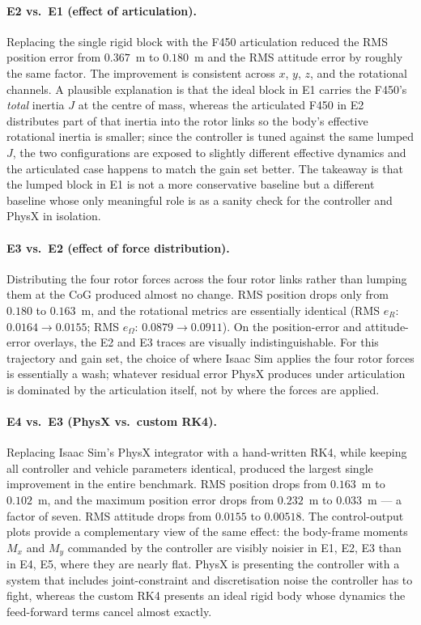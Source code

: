 \documentclass[11pt]{article}
\theoremstyle{remark}
\begin{document}
\paragraph{E2 vs.\ E1 (effect of articulation).} Replacing the single rigid block with the F450 articulation reduced the RMS position error from $0.367$~m to $0.180$~m and the RMS attitude error by roughly the same factor. The improvement is consistent across $x$, $y$, $z$, and the rotational channels. A plausible explanation is that the ideal block in E1 carries the F450's \emph{total} inertia $J$ at the centre of mass, whereas the articulated F450 in E2 distributes part of that inertia into the rotor links so the body's effective rotational inertia is smaller; since the controller is tuned against the same lumped $J$, the two configurations are exposed to slightly different effective dynamics and the articulated case happens to match the gain set better. The takeaway is that the lumped block in E1 is not a more conservative baseline but a different baseline whose only meaningful role is as a sanity check for the controller and PhysX in isolation.

\paragraph{E3 vs.\ E2 (effect of force distribution).} Distributing the four rotor forces across the four rotor links rather than lumping them at the CoG produced almost no change. RMS position drops only from $0.180$ to $0.163$~m, and the rotational metrics are essentially identical (RMS $e_R$: $0.0164 \to 0.0155$; RMS $e_\Omega$: $0.0879 \to 0.0911$). On the position-error and attitude-error overlays, the E2 and E3 traces are visually indistinguishable. For this trajectory and gain set, the choice of where Isaac Sim applies the four rotor forces is essentially a wash; whatever residual error PhysX produces under articulation is dominated by the articulation itself, not by where the forces are applied.

\paragraph{E4 vs.\ E3 (PhysX vs.\ custom RK4).} Replacing Isaac Sim's PhysX integrator with a hand-written RK4, while keeping all controller and vehicle parameters identical, produced the largest single improvement in the entire benchmark. RMS position drops from $0.163$~m to $0.102$~m, and the maximum position error drops from $0.232$~m to $0.033$~m --- a factor of seven. RMS attitude drops from $0.0155$ to $0.00518$. The control-output plots provide a complementary view of the same effect: the body-frame moments $M_x$ and $M_y$ commanded by the controller are visibly noisier in E1, E2, E3 than in E4, E5, where they are nearly flat. PhysX is presenting the controller with a system that includes joint-constraint and discretisation noise the controller has to fight, whereas the custom RK4 presents an ideal rigid body whose dynamics the feed-forward terms cancel almost exactly.
\end{document}
